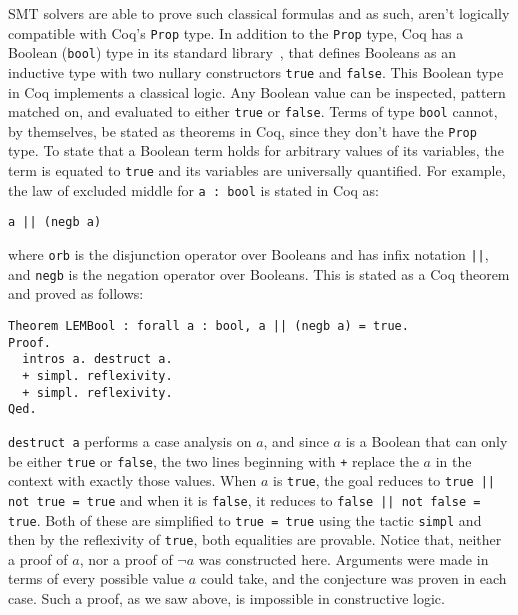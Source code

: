\documentclass{article}
\begin{document}
	SMT solvers are able to prove 
	such classical formulas and as
	such, aren't logically compatible
	with Coq's \texttt{Prop} type. 
	In addition to the \texttt{Prop} 
	type, Coq has a Boolean 
	(\texttt{bool}) type in its standard 
	library~\cite{CoqBool}, that defines 
	Booleans as an 
	inductive type with two nullary
	constructors \texttt{true} and
	\texttt{false}. This Boolean type 
	in Coq implements a classical 
	logic. Any Boolean value can 
	be inspected, pattern matched on,
	and evaluated to either 
	\texttt{true} or \texttt{false}.
	Terms of type \texttt{bool} 
	cannot, by themselves, be 
	stated as theorems
	in Coq, since they don't have 
	the \texttt{Prop} type. To 
	state that a Boolean term holds
	for arbitrary values of its variables,
	the term is 
	equated to \texttt{true}
	and its variables are 
	universally quantified. 
	For example, the law of 
	excluded middle for 
	\texttt{a : bool} is stated in 
	Coq as: 
	\begin{center}
		\texttt{a || (negb a)}
	\end{center}
	where \texttt{orb} is the 
	disjunction operator over 
	Booleans and has 
	infix notation \texttt{||},
	and \texttt{negb} is the 
	negation operator over 
	Booleans.
	This is stated as a Coq theorem 
	and proved as follows:
	\begin{verbatim}
Theorem LEMBool : forall a : bool, a || (negb a) = true.
Proof.
  intros a. destruct a.
  + simpl. reflexivity.
  + simpl. reflexivity.
Qed.
	\end{verbatim}
	\texttt{destruct a} performs a 
	case analysis on $a$, and since $a$ 
	is a Boolean that can 
	only be either \texttt{true}
	or \texttt{false}, the two lines
	beginning with \texttt{+} 
	replace the $a$ in the context
	with exactly those values.
	When $a$ is \texttt{true}, the 
	goal reduces to 
	\texttt{true || not true = true}
	and when it is \texttt{false}, it
	reduces to 
	\texttt{false || not false = true}.
	Both of these are simplified to 
	\texttt{true = true} using the 
	tactic \texttt{simpl} and then 
	by the reflexivity of 
	\texttt{true}, both equalities
	are provable. Notice that, 
	neither a proof of $a$, nor 
	a proof of $\neg a$ was 
	constructed here. Arguments were
	made in terms of every possible 
	value $a$ could take, and the
	conjecture was proven in 
	each case. Such a proof, as we 
	saw above, is impossible in 
	constructive logic.
	
\end{document}
